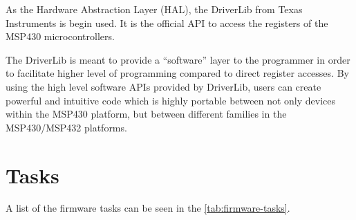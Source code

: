 As the Hardware Abstraction Layer (HAL), the DriverLib \cite{driverlib} from Texas Instruments is begin used. It is the official API to access the registers of the MSP430 microcontrollers.

The DriverLib is meant to provide a ``software'' layer to the programmer in order to facilitate higher level of programming compared to direct register accesses. By using the high level software APIs provided by DriverLib, users can create powerful and intuitive code which is highly portable between not only devices within the MSP430 platform, but between different families in the MSP430/MSP432 platforms.

\section{Tasks}

A list of the firmware tasks can be seen in the \autoref{tab:firmware-tasks}.

